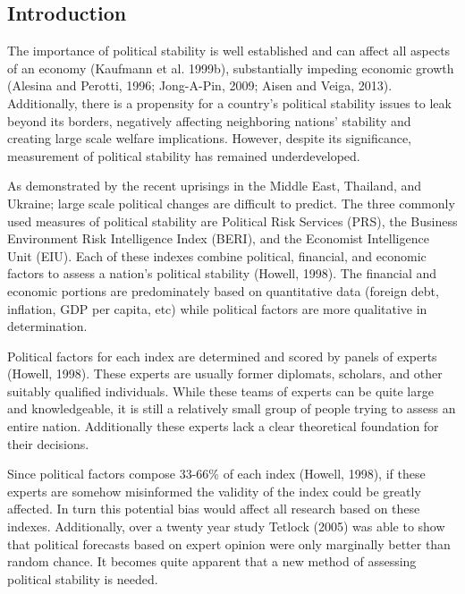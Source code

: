 \documentclass[12pt]{article}
\begin{document}
\begin{spacing}{1.5}

\section*{Introduction}

The importance of political stability is well established and can affect all aspects of an economy (Kaufmann et al. 1999b), substantially impeding economic growth (Alesina and Perotti, 1996; Jong-A-Pin, 2009; Aisen and Veiga, 2013). Additionally, there is a propensity for a country's political stability issues to leak beyond its borders, negatively affecting neighboring nations' stability and creating large scale welfare implications. However, despite its significance, measurement of political stability has remained underdeveloped. 

As demonstrated by the recent uprisings in the Middle East, Thailand, and Ukraine; large scale political changes are difficult to predict. The three commonly used measures of political stability are Political Risk Services (PRS), the Business Environment Risk Intelligence Index (BERI), and the Economist Intelligence Unit (EIU). Each of these indexes combine political, financial, and economic factors to assess a nation's political stability (Howell, 1998). The financial and economic portions are predominately based on quantitative data (foreign debt, inflation, GDP per capita, etc) while political factors are more qualitative in determination. 

Political factors for each index are determined and scored by panels of experts (Howell, 1998). These experts are usually former diplomats, scholars, and other suitably qualified individuals. While these teams of experts can be quite large and knowledgeable, it is still a relatively small group of people trying to assess an entire nation. Additionally these experts lack a clear theoretical foundation for their decisions. 

Since political factors compose 33-66\% of each index (Howell, 1998), if these experts are somehow misinformed the validity of the index could be greatly affected. In turn this potential bias would affect all research based on these indexes. Additionally, over a twenty year study Tetlock (2005) was able to show that political forecasts based on expert opinion were only marginally better than random chance. It becomes quite apparent that a new method of assessing political stability is needed.  


\end{spacing}
\end{document}
